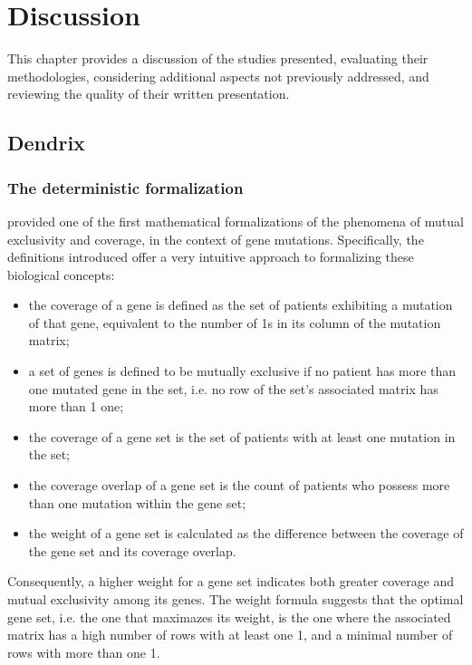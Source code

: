 \chapter{Discussion} \label{chap:discussion}

This chapter provides a discussion of the studies presented, evaluating their methodologies, considering additional aspects not previously addressed, and reviewing the quality of their written presentation.

\section{Dendrix}

\subsection{The deterministic formalization}

\textcite{dendrix} provided one of the first mathematical formalizations of the phenomena of mutual exclusivity and coverage, in the context of gene mutations. Specifically, the definitions introduced offer a very intuitive approach to formalizing these biological concepts:

\begin{itemize}
    \item the coverage of a gene is defined as the set of patients exhibiting a mutation of that gene, equivalent to the number of 1s in its column of the mutation matrix;
    \item a set of genes is defined to be mutually exclusive if no patient has more than one mutated gene in the set, i.e. no row of the set's associated matrix has more than 1 one;
    \item the coverage of a gene set is the set of patients with at least one mutation in the set;
    \item the coverage overlap of a gene set is the count of patients who possess more than one mutation within the gene set;
    \item the weight of a gene set is calculated as the difference between the coverage of the gene set and its coverage overlap.
\end{itemize}

Consequently, a higher weight for a gene set indicates both greater coverage and mutual exclusivity among its genes. The weight formula suggests that the optimal gene set, i.e. the one that maximazes its weight, is the one where the associated matrix has a high number of rows with at least one 1, and a minimal number of rows with more than one 1.

